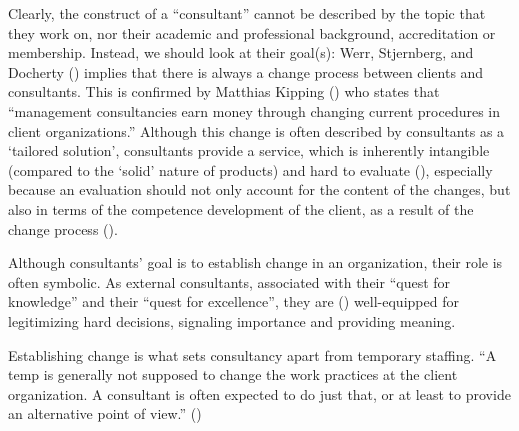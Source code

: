 \documentclass[
  man,floatsintext]{apa6}
\begin{document}
Clearly, the construct of a ``consultant'' cannot be described by the topic that they work on, nor their academic and professional background, accreditation or membership. Instead, we should look at their goal(s): Werr, Stjernberg, and Docherty () implies that there is always a change process between clients and consultants. This is confirmed by Matthias Kipping () who states that ``management consultancies earn money through changing current procedures in client organizations.'' Although this change is often described by consultants as a `tailored solution', consultants provide a service, which is inherently intangible (compared to the `solid' nature of products) and hard to evaluate (), especially because an evaluation should not only account for the content of the changes, but also in terms of the competence development of the client, as a result of the change process ().

Although consultants' goal is to establish change in an organization, their role is often symbolic. As external consultants, associated with their ``quest for knowledge'' and their ``quest for excellence'', they are () well-equipped for legitimizing hard decisions, signaling importance and providing meaning.

Establishing change is what sets consultancy apart from temporary staffing. ``A temp is generally not supposed to change the work practices at the client organization. A consultant is often expected to do just that, or at least to provide an alternative point of view.'' ()
\end{document}
